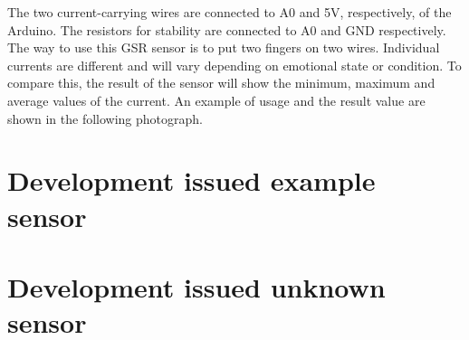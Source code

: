 \documentclass{report}
\begin{document}
The two current-carrying wires are connected to A0 and 5V, respectively, of the Arduino. The resistors for stability are connected to A0 and GND respectively.	\\

The way to use this GSR sensor is to put two fingers on two wires. Individual currents are different and will vary depending on emotional state or condition. To compare this, the result of the sensor will show the minimum, maximum and average values ​​of the current. An example of usage and the result value are shown in the following photograph.
\chapter{Development issued example sensor}

\chapter{Development issued unknown sensor}
\end{document}
